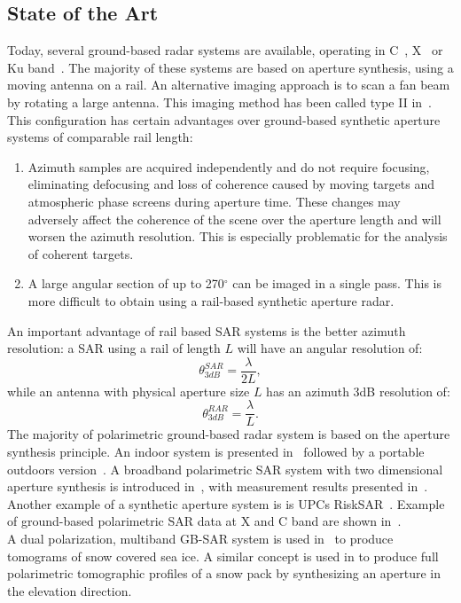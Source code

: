 \subsection{State of the Art}
Today, several ground-based radar systems are available, operating in C~\cite{Leva2003, Rudolf1999a,Kang2009}, X~\cite{Aguasca2004,Pipia2007a} or Ku band~\cite{Leva2003, Rudolf1999a,Werner2008, Rodelsperger2012}. The majority of these systems are based on aperture synthesis, using a moving antenna on a rail. 
An alternative imaging approach is to scan a fan beam by rotating a large antenna\cite{Werner2008,werner_gpri_2012}. This imaging method has been called type II in~\cite{Caduff2015}. 
This configuration has certain advantages over ground-based synthetic aperture systems\cite{Monserrat2014} of comparable rail length: \begin{enumerate}
  \item Azimuth samples are acquired independently and do not require focusing, eliminating defocusing and loss of coherence caused by moving targets and atmospheric phase screens during aperture time. 
These changes may adversely affect the coherence of the scene over the aperture length and will worsen the azimuth resolution. This is especially problematic for the analysis of coherent targets.\\
 \item A large 
angular section of up to 270$^{\circ}$ can be imaged in a single pass. This is more difficult to obtain using a rail-based synthetic aperture radar.\\
\end{enumerate}
An important advantage of rail based SAR systems is the better azimuth resolution: a SAR using a rail of length $L$ will have an angular resolution of: 
\begin{equation}
 	\theta_{3dB}^{SAR} = \frac{\lambda}{2L},
\end{equation}
while an antenna with physical aperture size $L$ has an azimuth 3dB resolution of:
\begin{equation}
 	\theta_{3dB}^{RAR} = \frac{\lambda}{L}.
\end{equation}
The majority of polarimetric ground-based radar system is based on the aperture synthesis principle. An indoor system is presented in~\cite{Bennett1996} followed by a portable outdoors version~\cite{Bennett2000}. A broadband polarimetric SAR system with two dimensional aperture synthesis is introduced in~\cite{Zhou2004}, with measurement results presented in~\cite{Hamasaki2005}.
Another example  of a synthetic aperture system is is UPCs RiskSAR~\cite{Iglesias2014, Aguasca2004,Pipia2007a,Pipia2009, Pipia2013,Iglesias2014}. Example of ground-based polarimetric SAR data at X and C band are shown in~\cite{Kang2009, Kang2010}.\\ A dual polarization, multiband GB-SAR system is used in~\cite{Yitayew2014} to produce tomograms of snow covered sea ice. A similar concept is used in\cite{Frey2015,Frey2016} to produce full polarimetric tomographic profiles of a snow pack by synthesizing an aperture in the elevation direction.\\
